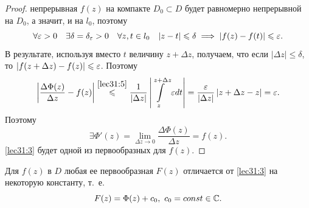 \documentclass[../../main.tex]{subfiles}
\begin{document}
\begin{proof}
	непрерывная $f(z)$ на компакте $D_0 \subset D$ будет равномерно
	непрерывной на $D_0$, а значит, и на $l_0$, поэтому
	\[ \forall \varepsilon > 0 \quad \exists \delta = \delta_\varepsilon
	> 0 \quad \forall z, t \in l_0 \quad |z - t| \leqslant \delta
	\implies |f(z) - f(t)| \leqslant \varepsilon. \]
	В результате, используя вместо $t$ величину $ z + \Delta z $, получаем, что
	если $| \Delta z| \le \delta$, то
	${| f(z + \Delta z ) - f(z) | \leqslant \varepsilon}$.
	Поэтому
	\[ \left| \dfrac{\Delta \Phi(z)}{\Delta z} - f(z) \right|
	\stackrel{ \eqref{lec31:5} }{\leqslant}
	\dfrac{1}{ | \Delta z | } \left| \int\limits_{z}^{z + \Delta z}
	\varepsilon dt \right| = 
	\dfrac{\varepsilon}{ | \Delta z | } \left| z + \Delta
	z - z \right| = \varepsilon.\]
	Поэтому
	\[ \exists \Phi ' (z) = \lim\limits_{\Delta z \to 0}
	\dfrac{\Delta \Phi(z)}{\Delta z} = f(z). \]	
	\eqref{lec31:3} будет одной из первообразных для $f(z)$.
\end{proof}

\begin{crl*}
	Для $ f(z) $ в $D$ любая ее первообразная $F(z)$ отличается от
	\eqref{lec31:3} на некоторую константу,
	т.~е.
	\begin{equation}
	\label{lec31:6}
		F(z) = \Phi(z) + c_0,\ c_0 = const \in \mathbb{C}.
	\end{equation}
\end{crl*}
\end{document}
